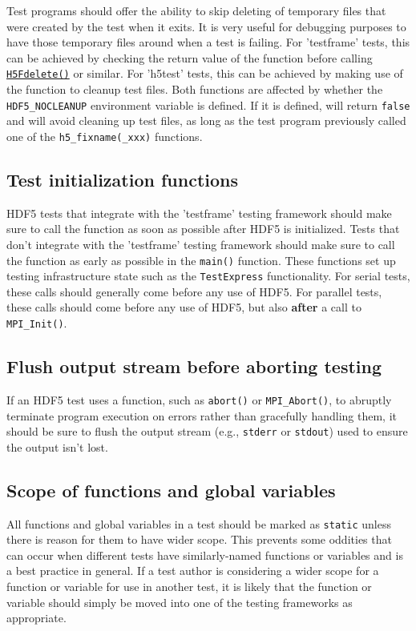 \documentclass[../HDF5_RFC.tex]{subfiles}
\begin{document}
Test programs should offer the ability to skip deleting of temporary files that were created by the test
when it exits. It is very useful for debugging purposes to have those temporary files around when a test
is failing. For 'testframe' tests, this can be achieved by checking the return value of the
 function before calling \href{https://support.hdfgroup.org/documentation/hdf5/latest/group___h5_f.html#ga2e8b5e19b343123e8ab21442f9169a62}{\texttt{H5Fdelete()}}
or similar. For 'h5test' tests, this can be achieved by making use of the  function to cleanup test files. Both functions are affected by whether the \texttt{HDF5\_NOCLEANUP} environment variable is defined. If it is defined,  will return \texttt{false} and  will avoid cleaning up test files, as long as the test program previously called one of the \texttt{h5\_fixname(\_xxx)} functions.

\subsection{Test initialization functions}

HDF5 tests that integrate with the 'testframe' testing framework should make sure to call the function
 as soon as possible after HDF5 is initialized. Tests that don't integrate with the 'testframe' testing framework should make sure to call the function  as early as possible in the \texttt{main()} function. These functions set up testing infrastructure state
such as the \texttt{TestExpress} functionality. For serial tests, these calls should generally come before
any use of HDF5. For parallel tests, these calls should come before any use of HDF5, but also \textbf{after}
a call to \texttt{MPI\_Init()}.

\subsection{Flush output stream before aborting testing}

If an HDF5 test uses a function, such as \texttt{abort()} or \texttt{MPI\_Abort()}, to abruptly terminate program execution on errors rather than gracefully handling them, it should be sure to flush the output
stream (e.g., \texttt{stderr} or \texttt{stdout}) used to ensure the output isn't lost.

\subsection{Scope of functions and global variables}

All functions and global variables in a test should be marked as \texttt{static} unless there is reason
for them to have wider scope. This prevents some oddities that can occur when different tests have
similarly-named functions or variables and is a best practice in general. If a test author is considering
a wider scope for a function or variable for use in another test, it is likely that the function or
variable should simply be moved into one of the testing frameworks as appropriate.
\end{document}
